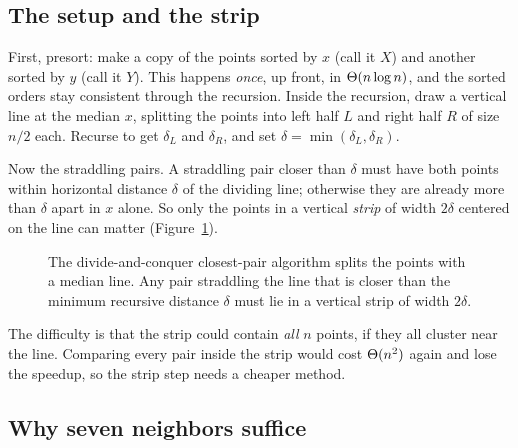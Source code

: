 \subsection{The setup and the strip}

First, presort: make a copy of the points sorted by $x$ (call it $X$) and another
sorted by $y$ (call it $Y$). This happens \emph{once}, up front, in
$\Theta(n \log n)$, and the sorted orders stay consistent through the recursion.
Inside the recursion, draw a vertical line at the median $x$, splitting the points
into left half $L$ and right half $R$ of size $n/2$ each. Recurse to get
$\delta_L$ and $\delta_R$, and set $\delta = \min(\delta_L, \delta_R)$.

Now the straddling pairs. A straddling pair closer than $\delta$ must have both
points within horizontal distance $\delta$ of the dividing line; otherwise they
are already more than $\delta$ apart in $x$ alone. So only the points in a
vertical \emph{strip} of width $2\delta$ centered on the line can matter (Figure~\ref{ch32:fig-strip}).

\begin{figure}[htbp]
\centering
{}
\caption{The divide-and-conquer closest-pair algorithm splits the points with a median line. Any pair straddling the line that is closer than the minimum recursive distance $\delta$ must lie in a vertical strip of width $2\delta$.}
\label{ch32:fig-strip}
\end{figure}

The difficulty is that the strip could contain \emph{all} $n$ points, if they all
cluster near the line. Comparing every pair inside the strip would cost
$\Theta(n^2)$ again and lose the speedup, so the strip step needs a cheaper method.

\subsection{Why seven neighbors suffice}

